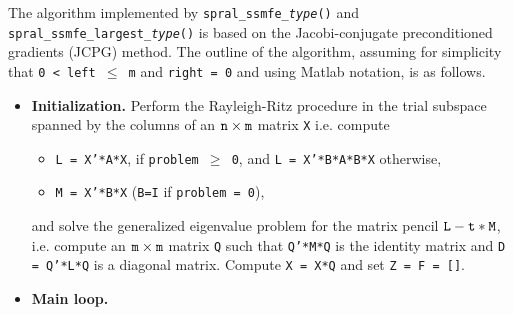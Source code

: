 The algorithm implemented by {\tt spral\_ssmfe\_\textit{type}()} and
{\tt spral\_ssmfe\_largest\_\textit{type}()}
is based on the Jacobi-conjugate preconditioned gradients (JCPG) method.
The outline of the algorithm,
assuming for simplicity
that {\tt 0 < left $\le$ m} and {\tt right = 0}
and using Matlab notation, is as follows.

\begin{itemize}
\item 
{\bf Initialization.}
Perform the Rayleigh-Ritz procedure
in the trial subspace spanned by the columns of 
an ${\tt n} \times {\tt m}$ matrix {\tt X} i.e. compute 
\begin{itemize}
\item 
{\tt L = X'*A*X},
if {\tt problem $\ge$ 0}, 
and
{\tt L = X'*B*A*B*X} otherwise,
\item
{\tt M = X'*B*X}
({\tt B=I} if {\tt problem = 0}),
\end{itemize}
% 
and solve the generalized eigenvalue problem
for the matrix pencil ${\tt L - t*M}$, i.e.
compute an ${\tt m} \times {\tt m}$ matrix {\tt Q}
such that {\tt Q'*M*Q} is the identity matrix
and {\tt D = Q'*L*Q} is a diagonal matrix.
Compute {\tt X = X*Q} and set {\tt Z = F = []}.
%
\item
{\bf Main loop.} 


\end{itemize}
